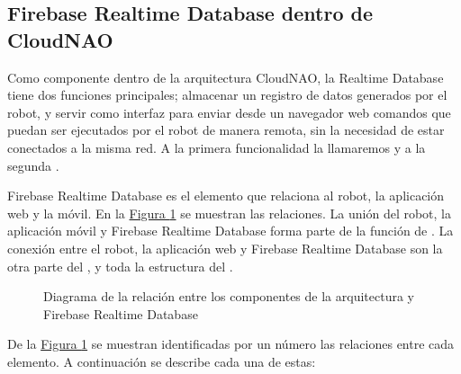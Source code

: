 


\subsection{Firebase Realtime Database dentro de CloudNAO}
\label{\detokenize{chapter_two/desc_cloudnao:firebase-realtime-database-y-cloudnao}}
Como componente dentro de la arquitectura CloudNAO, la Realtime Database tiene
dos funciones principales; almacenar un registro de datos generados por el robot,
y servir como interfaz para enviar desde un navegador web comandos que puedan
ser ejecutados por el robot de manera remota, sin la necesidad de estar
conectados a la misma red. A la primera
funcionalidad la llamaremos  y a la segunda .

Firebase Realtime Database es el elemento que relaciona al robot, la aplicación
web y la móvil. En la \hyperref[\detokenize{chapter_two/desc_cloudnao:rtd-components-diagram}]{Figura \ref{\detokenize{chapter_two/desc_cloudnao:rtd-components-diagram}}} se muestran las relaciones.
La unión del robot, la aplicación móvil y Firebase Realtime Database forma parte de
la función de . La conexión entre el robot, la aplicación web y
Firebase Realtime Database son la otra parte del , y toda la
estructura del .

\begin{figure}[htbp]
\centering
\capstart

\noindent{}
\caption{Diagrama de la relación entre los componentes de la arquitectura y Firebase Realtime Database}\label{\detokenize{chapter_two/desc_cloudnao:rtd-components-diagram}}\end{figure}

De la \hyperref[\detokenize{chapter_two/desc_cloudnao:rtd-components-diagram}]{Figura \ref{\detokenize{chapter_two/desc_cloudnao:rtd-components-diagram}}} se muestran identificadas por un número
las relaciones entre cada elemento. A continuación se describe cada una de estas:

